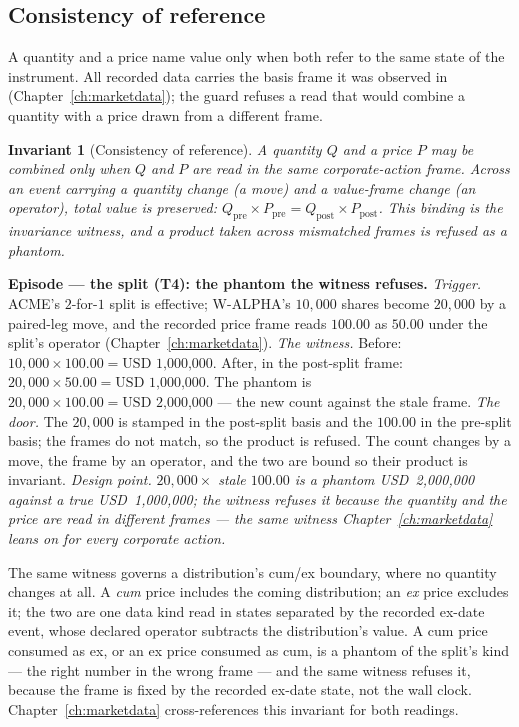 \documentclass[11pt,a4paper]{article}
\newcommand{\USD}[1]{\mbox{USD~#1}}
\newtheorem{invariant}[definition]{Invariant}
\begin{document}
\subsection{Consistency of reference}

A quantity and a price name value only when both refer to the same state of the
instrument. All recorded data carries the basis frame it was observed in
(Chapter~\ref{ch:marketdata}); the guard refuses a read that would combine a
quantity with a price drawn from a different frame.

\begin{invariant}[Consistency of reference]\label{inv:consistency}
A quantity $Q$ and a price $P$ may be combined only when $Q$ and $P$ are read in
the same corporate-action frame. Across an event carrying a quantity change (a
move) and a value-frame change (an operator), total value is preserved:
$Q_{\text{pre}}\times P_{\text{pre}} = Q_{\text{post}}\times P_{\text{post}}$.
This binding is the \emph{invariance witness}, and a product taken across
mismatched frames is refused as a phantom.
\end{invariant}

\medskip\noindent\textbf{Episode --- the split (T4): the phantom the witness
refuses.}
\emph{Trigger.} ACME's $2$-for-$1$ split is effective; W-ALPHA's $10{,}000$
shares become $20{,}000$ by a paired-leg move, and the recorded price frame reads
$100.00$ as $50.00$ under the split's operator (Chapter~\ref{ch:marketdata}).
\emph{The witness.} Before: $10{,}000\times 100.00 = \USD{1{,}000{,}000}$. After,
in the post-split frame: $20{,}000\times 50.00 = \USD{1{,}000{,}000}$. The phantom
is $20{,}000\times 100.00 = \USD{2{,}000{,}000}$ --- the new count against the
stale frame. \emph{The door.} The $20{,}000$ is stamped in the post-split basis
and the $100.00$ in the pre-split basis; the frames do not match, so the product
is refused. The count changes by a move, the frame by an operator, and the two
are bound so their product is invariant.
\emph{Design point.} \emph{$20{,}000\times$ stale $100.00$ is a phantom
\USD{2{,}000{,}000} against a true \USD{1{,}000{,}000}; the witness refuses it
because the quantity and the price are read in different frames --- the same
witness Chapter~\ref{ch:marketdata} leans on for every corporate action.}

The same witness governs a distribution's cum/ex boundary, where no quantity
changes at all. A \emph{cum} price includes the coming distribution; an \emph{ex}
price excludes it; the two are one data kind read in states separated by the
recorded ex-date event, whose declared operator subtracts the distribution's
value. A cum price consumed as ex, or an ex price consumed as cum, is a phantom of
the split's kind --- the right number in the wrong frame --- and the same witness
refuses it, because the frame is fixed by the recorded ex-date state, not the wall
clock. Chapter~\ref{ch:marketdata} cross-references this invariant for both
readings.
\end{document}
